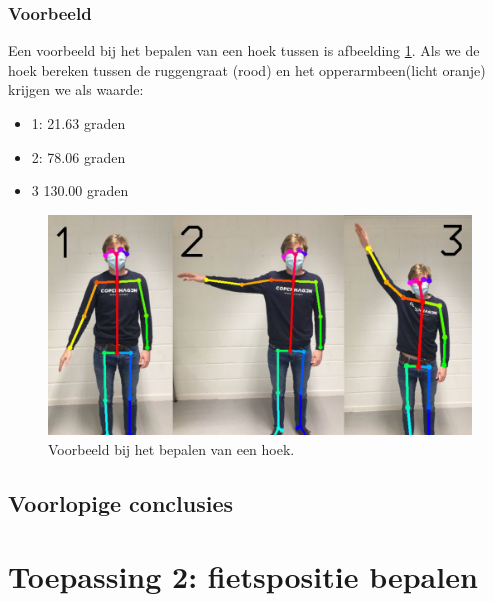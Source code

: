 \documentclass{article}
\begin{document}
\subsubsection{Voorbeeld}
Een voorbeeld bij het bepalen van een hoek tussen is afbeelding \ref{samen}. Als we de hoek bereken tussen de ruggengraat (rood) en het opperarmbeen(licht oranje) krijgen we als waarde:
\begin{itemize}
	\item 1: 21.63 graden
	\item 2: 78.06 graden
	\item 3 130.00 graden
\end{itemize}
\begin{figure}
	\begin{center}
		\includegraphics[width=12cm]{samen.jpg}
	\end{center}
	\caption{Voorbeeld bij het bepalen van een hoek.}
	\label{samen}
\end{figure}
	\subsection{Voorlopige conclusies}

\section{Toepassing 2: fietspositie bepalen}
\end{document}
